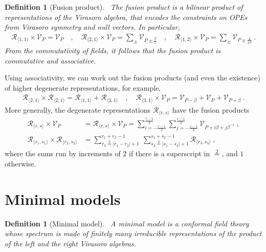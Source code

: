 \documentclass[12pt, a4paper]{article}
\theoremstyle{break}
\newtheorem{defn}[exo]{Definition}
\begin{document}
\begin{defn}[Fusion product]
 ~\label{def:fus}
 The fusion product is a bilinear product of representations of the Virasoro algebra, that encodes the constraints on OPEs from Virasoro symmetry and null vectors. In particular,
 \begin{align}
  \mathcal{R}_{\langle 1,1\rangle}\times \mathcal V_P = \mathcal V_P \quad , \quad 
  \mathcal{R}_{\langle 2,1\rangle}\times \mathcal V_P = \sum_\pm \mathcal V_{P\pm \frac{\beta}{2}}\quad , \quad  
  \mathcal{R}_{\langle 1,2\rangle}\times \mathcal V_P = \sum_\pm \mathcal V_{P\pm \frac{1}{2\beta}}\ .
  \label{eq:rv}
 \end{align}
 From the commutativity of fields, it follows that the fusion product is commutative and associative.
\end{defn}
Using associativity, we can work out the fusion products (and even the existence) of higher degenerate representations, for example, 
\begin{align}
 \mathcal{R}_{\langle 2,1\rangle}\times \mathcal{R}_{\langle 2,1\rangle} = \mathcal{R}_{\langle 1,1\rangle} + \mathcal{R}_{\langle 3,1\rangle} \quad , \quad \mathcal{R}_{\langle 3,1\rangle} \times \mathcal V_P = \mathcal V_{P - \beta} + \mathcal V_P + \mathcal V_{P + \beta}\ .
\end{align}
More generally, the degenerate representations $\mathcal{R}_{\langle r,s \rangle}$ have the fusion products
 \begin{align}
 \mathcal{R}_{\langle r,s \rangle}\times \mathcal{V}_P &= \mathcal{R}_{\langle r,s \rangle}\times \mathcal{V}_P = \sum_{i=-\frac{r-1}{2}}^{\frac{r-1}{2}} \sum_{j=-\frac{s-1}{2}}^{\frac{s-1}{2}} \mathcal{V}_{P + i\beta+j\beta^{-1}}\ ,
\label{rtv}
 \\
 \mathcal{R}_{\langle r_1,s_1 \rangle} \times \mathcal{R}_{\langle r_2,s_2 \rangle} &= \sum_{r_3\overset{2}{=}|r_1-r_2|+1}^{r_1+r_2-1}\ \sum_{s_3\overset{2}{=}|s_1-s_2|+1}^{s_1+s_2-1} \mathcal{R}_{\langle r_3,s_3 \rangle}\ ,
\label{rrsr}
\end{align}
where the sums run by increments of $2$ if there is a superscript in $\overset{2}{=}$, and $1$ otherwise.

\section{Minimal models}

\begin{defn}[Minimal model]
 ~\label{def:mm}
 A minimal model is a conformal field theory whose spectrum is made of finitely many irreducible representations of the product of the left and the right Virasoro algebras.
\end{defn}
\end{document}
